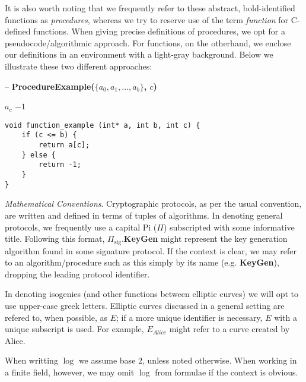 It is also worth noting that we frequently refer to these abstract, bold-identified functions as \textit{procedures}, whereas we try to reserve use of the term \textit{function} for C-defined functions. When giving precise definitions of procedures, we opt for a pseudocode/algorithmic approach. For functions, on the otherhand, we enclose our definitions in an environment with a light-gray background. Below we illustrate these two different approaches:\\

\begin{algorithm}
\caption{-- \textbf{ProcedureExample($\{a_0, a_1, ... , a_b\}$, $c$)}}\label{alg:procedureexample}
\begin{algorithmic}[1]
	\State \Return $a_c$
\Else
	\State \Return $-1$
\EndIf
\end{algorithmic}
\end{algorithm}

\label{code:pbinv}
\begin{lstlisting}
void function_example (int* a, int b, int c) {
	if (c <= b) {
		return a[c];
	} else {
		return -1;
	}
}
\end{lstlisting}

\vspace{15px}

\noindent
\textit{Mathematical Conventions}. Cryptographic protocols, as per the usual convention, are written and defined in terms of tuples of algorithms. In denoting general protocols, we frequently use a capital Pi ($\Pi$) subscripted with some informative title. Following this format, $\Pi_{\text{sig}}$.\textbf{KeyGen} might represent the key generation algorithm found in some signature protocol. If the context is clear, we may refer to an algorithm/procedure such as this simply by its name (e.g. \textbf{KeyGen}), dropping the leading protocol identifier.

In denoting isogenies (and other functions between elliptic curves) we will opt to use upper-case greek letters. Elliptic curves discussed in a general setting are refered to, when possible, as $E$; if a more unique identifier is necessary, $E$ with a unique subscript is used. For example, $E_{Alice}$ might refer to a curve created by Alice.

When writting $\log$ we assume base 2, unless noted otherwise. When working in a finite field, however, we may omit $\log$ from formulae if the context is obvious.

